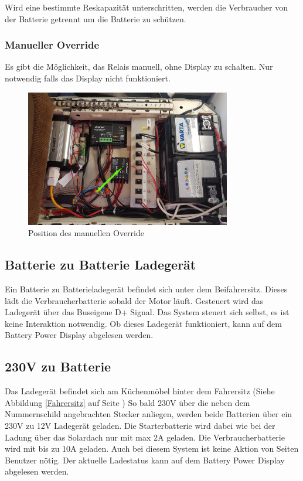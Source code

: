 Wird eine bestimmte Reskapazität unterschritten, werden die Verbraucher von der Batterie getrennt um die Batterie zu schützen.
\subsubsection{Manueller Override}
Es gibt die Möglichkeit, das Relais manuell, ohne Display zu schalten. Nur notwendig falls das Display nicht funktioniert.

\begin{figure}[H]
	\centering
  \includegraphics[width=0.8\textwidth]{../Bilder/Anleitung/Emergency.png}
	\caption{Position des manuellen Override}
    \label{Manueller Override}
\end{figure}

\subsection{Batterie zu Batterie Ladegerät}
Ein  Batterie zu Batterieladegerät befindet sich unter dem Beifahrersitz.
Dieses lädt die Verbraucherbatterie sobald der Motor läuft.
Gesteuert wird das Ladegerät über das Buseigene D+ Signal.
Das System steuert sich selbst, es ist keine Interaktion notwendig.
Ob dieses Ladegerät funktioniert, kann auf dem Battery Power Display abgelesen werden. 

\subsection{230V zu Batterie}
Das Ladegerät befindet sich am Küchenmöbel hinter dem Fahrersitz (Siehe Abbildung \ref{Fahrersitz} auf Seite \pageref{Fahrersitz})
So bald 230V über die neben dem Nummernschild angebrachten Stecker anliegen, werden beide Batterien über ein 230V zu 12V Ladegerät geladen.
Die Starterbatterie wird dabei wie bei der Ladung über das Solardach nur mit max 2A geladen.
Die Verbraucherbatterie wird mit bis zu 10A geladen.
Auch bei diesem System ist keine Aktion von Seiten Benutzer nötig. 
Der aktuelle Ladestatus kann auf dem Battery Power Display abgelesen werden.


